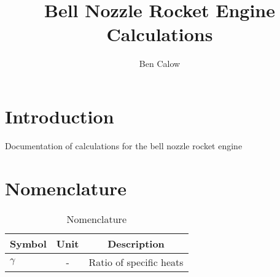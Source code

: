 \documentclass{article}
\title{Bell Nozzle Rocket Engine Calculations}
\author{Ben Calow}
\begin{document}
\clearpage\maketitle
\thispagestyle{empty}

\pagebreak

\setcounter{page}{1}

\tableofcontents

\section{Introduction}

Documentation of calculations for the bell nozzle rocket engine

\section{Nomenclature}

\begin{table}[h!]
    \begin{center}
        \begin{tabular}{|l|c|c|}
            \hline
            \textbf{Symbol} & \textbf{Unit} & \textbf{Description}\\
            \hline
            $\gamma$ & - & Ratio of specific heats\\
            \hline
        \end{tabular}
        \caption{Nomenclature}
    \end{center}
\end{table}
\end{document}
